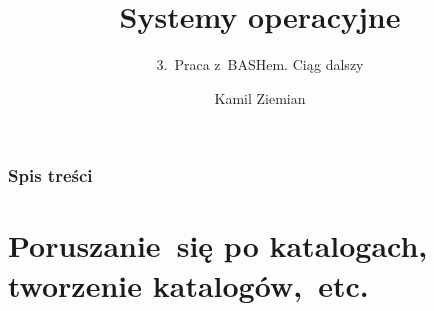 \documentclass[10pt,t]{beamer}
\title{Systemy operacyjne}
\subtitle{3.~Praca z~BASHem. Ciąg dalszy}
\author{Kamil Ziemian \\
  \email}
\begin{document}





\RaggedRight





\maketitle





\begin{frame}
  \frametitle{Spis treści}


  \tableofcontents

\end{frame}










\section{Poruszanie~się po katalogach, tworzenie
  katalogów,~etc.}
\end{document}
